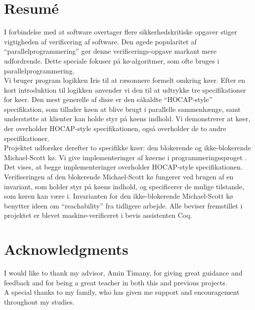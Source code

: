 \documentclass[a4paper, 10pt]{report}
\theoremstyle{definition}
\begin{document}

\chapter*{Resum\'e}

I forbindelse med at software overtager flere sikkerhedskritiske opgaver stiger vigtigheden af verificering af software. Den øgede popularitet af ``parallelprogrammering'' gør denne verificerings-opgave markant mere udfordrende. Dette speciale fokuser på kø-algoritmer, som ofte bruges i parallelprogrammering.\\
Vi bruger program logikken Iris til at ræsonnere formelt omkring køer. Efter en kort introduktion til logikken anvender vi den til at udtrykke tre specifikationer for køer. Den mest generelle af disse er den såkaldte ``HOCAP-style'' specifikation, som tillader køen at blive brugt i parallelle sammenhænge, samt understøtte at klienter kan holde styr på køens indhold. Vi demonstrerer at køer, der overholder HOCAP-style specifikationen, også overholder de to andre specifikationer.\\
Projektet udforsker derefter to specifikke køer: den blokerende og ikke-blokerende Michael-Scott kø. Vi give implementeringer af køerne i programmeringssproget \heaplang{}. Det vises, at begge implementeringer overholder HOCAP-style specifikationen. Verifiseringen af den blokerende Michael-Scott kø fungerer ved brugen af en invariant, som holder styr på køens indhold, og specificerer de mulige tilstande, som køren kan være i. Invarianten for den ikke-blokerende Michael-Scott kø benytter ideen om ``reachability'' fra tidligere arbejde. Alle beviser fremstillet i projektet er blevet maskine-verificeret i bevis assistenten Coq.


\chapter*{Acknowledgments}

I would like to thank my advisor, Amin Timany, for giving great guidance and feedback and for being a great teacher in both this and previous projects.\\
A special thanks to my family, who has given me support and encouragement throughout my studies.
\end{document}
